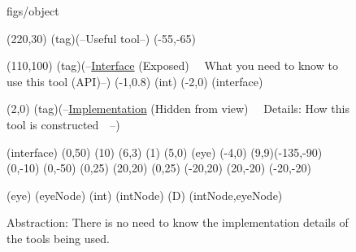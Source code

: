 






\begin {figure}


\Draw


 {figs/object}

\MinNodeSize(220,30)
\RectNode(tag)(--Useful tool--)
\Move(-55,-65)

\MinNodeSize(110,100)
\RectNode(tag)(--\underline{Interface}
		(Exposed)~~
		What you need to
		know to use this
		tool
		(API)--)
{ \MoveToExit(-1,0.8) \MarkGLoc(int)      }
{ \MoveToExit(-2,0)  \MarkGLoc(interface)  }

\MoveToExit (2,0)
\RectNode(tag)(--\underline{Implementation}
		(Hidden from view)~~
		Details:
		How this tool is
		constructed~~--)

\MoveToLoc(interface)
\Move(0,50)
\DrawCircle(10)
{ \Move(6,3) \PaintCircle(1) \Move (5,0) \MarkGLoc(eye)  	%
  \Move(-4,0) \DrawOvalArc (9,9)(-135,-90)			%
}
\Move (0,-10)
\Line(0,-50)
{ \Move(0,25) \Line(20,20) }
{ \Move(0,25) \Line(-20,20) }
{ \Line(20,-20) }
{ \Line(-20,-20) }

\MoveToLoc(eye) \FcNode(eyeNode)   
\MoveToLoc(int) \FcNode(intNode)   
\EdgeSpec(D)						%
\Edge (intNode,eyeNode)



\EndDraw

\caption {Abstraction: 
There is no need to know the implementation 
details of the tools being used.}


\label {fig:methAbstr1}

\end {figure}


